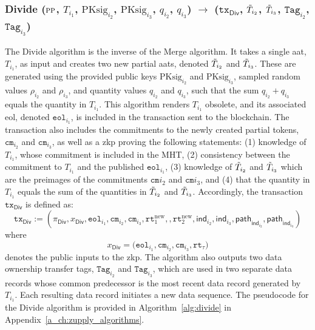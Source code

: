 


\subsubsection{\textsf{Divide} ($\textsc{pp}$, $T_{i_1}$,  $\text{PKsig}_{i_{2}}$, $\text{PKsig}_{i_{3}}$, $q_{i_{2}}$, $q_{i_{3}}$) $\rightarrow$ ($\texttt{tx}_{\textsf{Div}}$, $\Tilde{T}_{i_{2}}$, $\Tilde{T}_{i_{3}}$, $\texttt{Tag}_{i_{2}}$, $\texttt{Tag}_{i_{3}}$)}

The \textsf{Divide} algorithm is the inverse of the \textsf{Merge} algorithm. It takes a single \gls{aat}, $T_{i_1}$, as input and creates two new partial \glspl{aat}, denoted $\Tilde{T}_{i_2}$ and $\Tilde{T}_{i_3}$. These are generated using the provided public keys $\text{PKsig}_{i_2}$ and $\text{PKsig}_{i_3}$, sampled random values $\rho_{i_2}$ and $\rho_{i_3}$, and quantity values $q_{i_2}$ and $q_{i_3}$, such that the sum $q_{i_2} + q_{i_3}$ equals the quantity in $T_{i_1}$. 
This algorithm renders $T_{i_1}$ obsolete, and its associated \gls{eol}, denoted $\texttt{eol}_{i_1}$, is included in the transaction sent to the blockchain. The transaction also includes the commitments to the newly created partial tokens, $\texttt{cm}_{i_2}$ and $\texttt{cm}_{i_3}$, as well as a \gls{zkp} proving the following statements: (1) knowledge of $T_{i_1}$, whose commitment is included in the \textsf{MHT}, (2) consistency between the commitment to $T_{i_1}$ and the published $\texttt{eol}_{i_1}$, (3)  knowledge of $\Tilde{T}_{i_2}$ and $\Tilde{T}_{i_3}$ which are the preimages of the commitments $\texttt{cm}{i_2}$ and $\texttt{cm}{i_3}$, and (4)  that the quantity in $T_{i_1}$ equals the sum of the quantities in $\Tilde{T}_{i_2}$ and $\Tilde{T}_{i_3}$.
Accordingly, the transaction $\texttt{tx}_{\textsf{Div}}$ is defined as:
\[
\texttt{tx}_\mathsf{Div} :=(\pi_{\mathsf{Div}}, x_\mathsf{Div}, \texttt{eol}_{i_{1}},  \texttt{cm}_{i_{2}}, \texttt{cm}_{i_{3}}, \texttt{rt}_{1}^{\text{new}}, , \texttt{rt}_{2}^{\text{new}}, \mathsf{ind}_{i_{2}}, \mathsf{ind}_{i_{3}}, \mathsf{path}_{\mathsf{ind}_{i_{2}}}, \mathsf{path}_{\mathsf{ind}_{i_{3}}} )
\]
where
\[
x_\mathsf{Div} =\big(\texttt{eol}_{i_1}, \texttt{cm}_{i_{2}}, \texttt{cm}_{i_{3}}, \texttt{rt}_\tau \big)
\]
denotes the public inputs to the \gls{zkp}.  The algorithm also outputs two data ownership transfer tags, $\texttt{Tag}_{i_2}$ and $\texttt{Tag}_{i_3}$, which are used in two separate data records whose common predecessor is the most recent data record generated by $T_{i_1}$. Each resulting data record initiates a new data sequence.  The pseudocode for the \textsf{Divide} algorithm is provided in Algorithm~\ref{alg:divide} in Appendix~\ref{a_ch:zupply_algorithms}.

